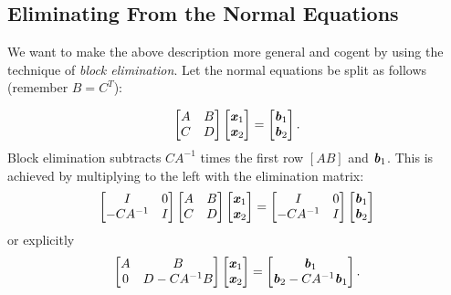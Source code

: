 \subsection{Eliminating From the Normal Equations}
\begin{flushleft}
	We want to make the above description more general and cogent by using the technique of \textit{block elimination}. Let the normal equations be split as follows (remember $B=C^{T}$):
\end{flushleft}
\begin{align*}
\begin{bmatrix}
A  & B\\
C  & D
\end{bmatrix}
\begin{bmatrix}
\textbf{\textit{x}}_{1}\\
\textbf{\textit{x}}_{2}
\end{bmatrix} =
\begin{bmatrix}
\textbf{\textit{b}}_{1}\\
\textbf{\textit{b}}_{2}
\end{bmatrix}.
\end{align*}
Block elimination subtracts $CA^{-1}$ times the first row $[A B]$ and $\textbf{\textit{b}}_{1}$. This is achieved by multiplying to the left with the elimination matrix:
\begin{align*}
\begin{bmatrix}
I  &  0\\
-CA^{-1} & I
\end{bmatrix}
\begin{bmatrix}
A  &  B\\
C &   D
\end{bmatrix}
\begin{bmatrix}
\textbf{\textit{x}}_{1}\\
\textbf{\textit{x}}_{2}
\end{bmatrix} =
\begin{bmatrix}
I  &  0\\
-CA^{-1} & I
\end{bmatrix}
\begin{bmatrix}
\textbf{\textit{b}}_{1}\\
\textbf{\textit{b}}_{2}
\end{bmatrix}
\end{align*}
or explicitly
\begin{align*}
\begin{bmatrix}
A & B\\
0 & D-CA^{-1}B
\end{bmatrix}
\begin{bmatrix}
\textbf{\textit{x}}_{1}\\
\textbf{\textit{x}}_{2}
\end{bmatrix}
=
\begin{bmatrix}
\textbf{\textit{b}}_{1}\\
\textbf{\textit{b}}_{2} - CA^{-1}\textbf{\textit{b}}_{1}
\end{bmatrix}.
\end{align*}
